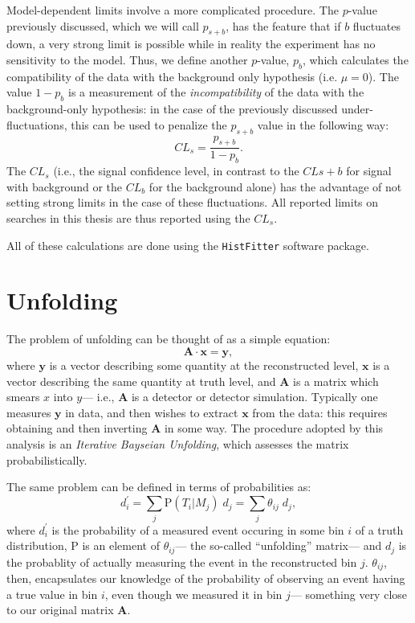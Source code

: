 Model-dependent limits involve a more complicated procedure. The $p$-value previously discussed, which we will call $p_{s+b}$, has the feature that if $b$ fluctuates down, a very strong limit is possible while in reality the experiment has no sensitivity to the model. Thus, we define another $p$-value, $p_b$, which calculates the compatibility of the data with the background only hypothesis (i.e. $\mu=0$). The value $1-p_b$ is a measurement of the \textit{incompatibility} of the data with the background-only hypothesis: in the case of the previously discussed under-fluctuations, this can be used to penalize the $p_{s+b}$ value in the following way:
%
\begin{equation}
CL_s = \frac{p_{s+b}}{1-p_b}.
\end{equation} 
%
The $CL_s$ (i.e., the signal confidence level, in contrast to the $CL{s+b}$ for signal with background or the $CL_b$ for the background alone) has the advantage of not setting strong limits in the case of these fluctuations. All reported limits on searches in this thesis are thus reported using the $CL_s$.

All of these calculations are done using the \texttt{HistFitter} software package. 

\section{Unfolding}
\label{appendix:statistics:unfolding}

	The problem of unfolding can be thought of as a simple equation:
	\begin{equation}
	\mathbf{A} \cdot \mathbf{x} = \mathbf{y},
	\end{equation}
	where $\mathbf{y}$ is a vector describing some quantity at the reconstructed level, $\mathbf{x}$ is a vector describing the same quantity at truth level, and $\mathbf{A}$ is a matrix which smears $x$ into $y$--- i.e., $\mathbf{A}$ is a detector or detector simulation. Typically one measures $\mathbf{y}$ in data, and then wishes to extract $\mathbf{x}$ from the data: this requires obtaining and then inverting $\mathbf{A}$ in some way. The procedure adopted by this analysis is an \textit{Iterative Bayseian Unfolding}, which assesses the matrix probabilistically.

	The same problem can be defined in terms of probabilities as:
%
\begin{equation}
  d^\prime_i = \sum_j\mathrm{P}(T_i|M_j)\;d_j  = \sum_{j}\theta_{ij}\;d_j,
\end{equation}
%
	where $d^\prime_i$ is the probability of a measured event occuring in some bin $i$ of a truth distribution, $\mathrm{P}$ is an element of $\theta_{ij}$--- the so-called ``unfolding'' matrix--- and $d_j$ is the probablity of actually measuring the event in the reconstructed bin $j$. $\theta_{ij}$, then, encapsulates our knowledge of the probability of observing an event having a true value in bin $i$, even though we measured it in bin $j$--- something very close to our original matrix $\mathbf{A}$.

